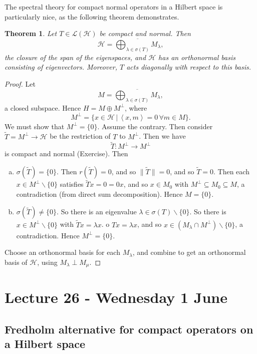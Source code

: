 \documentclass[10pt, oneside, reqno]{amsart}
\theoremstyle{plain}%
\newtheorem{thm}{Theorem}[section]
\theoremstyle{definition}
\theoremstyle{remark}
\newcommand{\given}{ \, | \,}
\newcommand{\iprod}[1]{\left\langle #1 \right\rangle}
\begin{document}
The spectral theory for compact normal operators in a Hilbert space is particularly nice, as the following theorem demonstrates.
\begin{thm}
	Let $T \in \mathcal L(\mathcal H)$ be compact and normal.  Then \[
		\mathcal H = \overline{\bigoplus_{\lambda \in \sigma(T)} M_\lambda},
	\] the closure of the span of the eigenspaces, and $\mathcal H$ has an orthonormal basis consisting of eigenvectors.  Moreover, $T$ acts diagonally with respect to this basis.   
\end{thm}
\begin{proof}
	Let \[
		M = \overline{\bigoplus_{\lambda \in \sigma(T)} M_\lambda},
	\] a closed subspace.  Hence $H = M \oplus M^\perp$, where \[
	M^\perp = \{ x \in \mathcal H \given \iprod{x, m} = 0 \, \forall m \in M \}.
	\]   We must show that $M^\perp = \{ 0 \}$.  Assume the contrary.  Then consider $\tilde T = M^\perp \rightarrow \mathcal H$ be the restriction of $T$ to $M^\perp$.  Then we have \[
		\tilde T: M^\perp \rightarrow M^\perp
	\] is compact and normal (Exercise). Then  \begin{enumerate}[(a)]
		\item $\sigma(\tilde T) = \{ 0 \}$.  Then $r(\tilde T) = 0$, and so $\| \tilde T \| = 0$, and so $\tilde T = 0$.  Then each $x \in M^\perp \backslash \{ 0 \}$ satisfies $\tilde T x = 0 = 0x$, and so $x \in M_0$ with $M^\perp \subseteq M_0 \subseteq M$, a contradiction (from direct sum decomposition).  Hence $M = \{ 0 \}$.  
		\item $\sigma(\tilde T) \neq \{ 0 \}$.  So there is an eigenvalue $\lambda \in \sigma(T) \backslash \{ 0 \}$.  So there is $x \in M^\perp \backslash \{ 0 \}$ with $\tilde T x = \lambda x$.  o $Tx = \lambda x$, and so $x \in (M_\lambda \cap M^\perp) \backslash \{ 0 \}$, a contradiction.  Hence $M^\perp = \{ 0 \}$.    
	\end{enumerate}
	
	Choose an orthonormal basis for each $M_\lambda$, and combine to get an orthonormal basis of $\mathcal H$, using $M_\lambda \perp M_\mu$.  
\end{proof}  




\section{Lecture 26 - Wednesday 1 June} %
\label{sec:lecture_26_wednesday_1_june}
\subsection{Fredholm alternative for compact operators on a Hilbert space} %
\label{sub:fredholm_alternative_for_compact_operators_on_hilbert_space}
\end{document}
